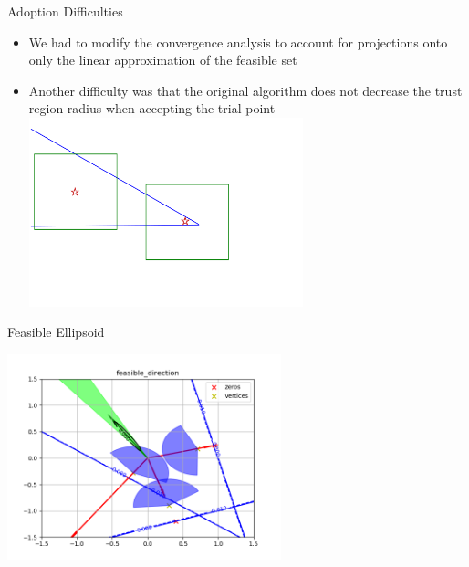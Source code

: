 \documentclass{beamer}
\begin{document}
% 


\begin{frame}{Adoption Difficulties}

\begin{itemize}
    \item We had to modify the convergence analysis to account for projections onto only the linear approximation of the feasible set
    \item Another difficulty was that the original algorithm does not decrease the trust region radius when accepting the trial point
    \includegraphics[width=300px]{images/decrease_required.png}
\end{itemize}
\end{frame}


\begin{frame}{Feasible Ellipsoid}
	\begin{center}
		\includegraphics[width=300px]{images/feasible_direction.png}
	\end{center}
\end{frame}
\end{document}
